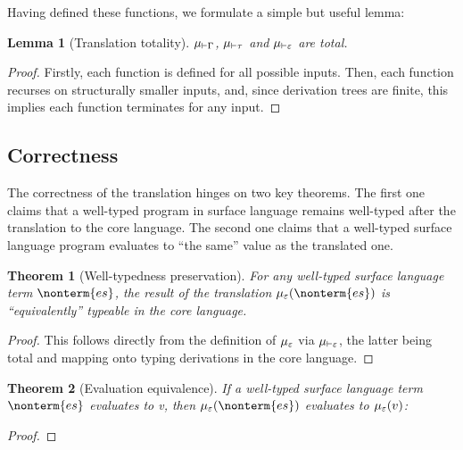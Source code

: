 \documentclass[a4paper]{article}
\newtheorem{theorem}{Theorem}
\newtheorem{lemma}{Lemma}
\begin{document}
Having defined these functions, we formulate a simple but useful lemma:
\begin{lemma}[Translation totality]
  $\mu_{\vdash\Gamma}$, $\mu_{\vdash\tau}$ and $\mu_{\vdash\varepsilon}$ are total.
\end{lemma}
\begin{proof}
  Firstly, each function is defined for all possible inputs.
  Then, each function recurses on structurally smaller inputs,
  and, since derivation trees are finite,
  this implies each function terminates for any input.
\end{proof}

\subsection{Correctness}

The correctness of the translation hinges on two key theorems.
The first one claims that a well-typed program in surface language remains well-typed after the translation to the core language.
The second one claims that a well-typed surface language program evaluates to ``the same'' value as the translated one.

\begin{theorem}[Well-typedness preservation]
  For any well-typed surface language term $\nonterm{es}$,
  the result of the translation $\tranterm(\nonterm{es})$ is ``equivalently'' typeable in the core language.
\end{theorem}
\begin{proof}
  This follows directly from the definition of $\mu_\varepsilon$ via $\mu_{\vdash\varepsilon}$,
  the latter being total and mapping onto typing derivations in the core language.
\end{proof}

\begin{theorem}[Evaluation equivalence]
  If a well-typed surface language term $\nonterm{es}$ evaluates to v, then $\tranterm(\nonterm{es})$ evaluates to $\mu_\varepsilon(v)$:
\end{theorem}
\begin{proof}
\end{proof}



\end{document}
